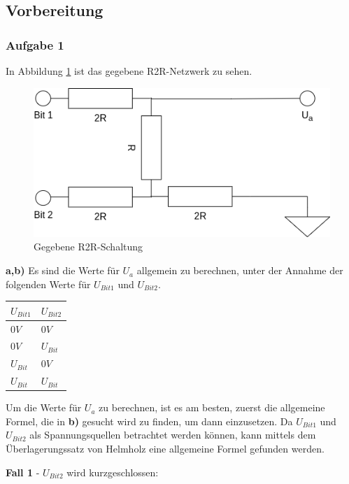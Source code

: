 \subsection{Vorbereitung}
\label{subsec:a5-vorbereitung}

\subsubsection{Aufgabe 1}
In Abbildung \ref{fig:gegebene-r2r-schaltung} ist das gegebene R2R-Netzwerk zu sehen.

\begin{figure}
    \centering
    \includegraphics[width=\textwidth]{pictures/a5-1-vorbereitung.png}
    \caption{Gegebene R2R-Schaltung}
    \label{fig:gegebene-r2r-schaltung}
\end{figure}

\textbf{a,b)} Es sind die Werte für $U_a$ allgemein zu berechnen, unter der Annahme der folgenden Werte für $U_{Bit 1}$ und $U_{Bit 2}$.

\begin{tabular}{| l | l |}
    \hline
    $U_{Bit 1}$ & $U_{Bit 2}$ \\
    \hline
    $0V$ & $0V$ \\
    $0V$ & $U_{Bit}$ \\
    $U_{Bit}$ & $0V$ \\
    $U_{Bit}$ & $U_{Bit}$ \\
    \hline
\end{tabular}

Um die Werte für $U_a$ zu berechnen, ist es am besten, zuerst die allgemeine Formel, die in \textbf{b)} gesucht wird zu finden, um dann einzusetzen.
Da $U_{Bit 1}$ und $U_{Bit 2}$ als Spannungsquellen betrachtet werden können, kann mittels dem Überlagerungssatz von Helmholz eine allgemeine Formel gefunden werden.

\textbf{Fall 1} - $U_{Bit 2}$ wird kurzgeschlossen:

